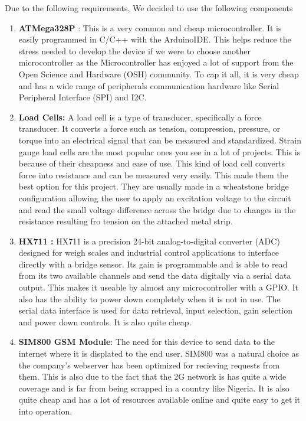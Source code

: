 Due to the following requirements, We decided to use the following components
\begin{enumerate}
\item \textbf{ATMega328P} : This is a very common and cheap microcontroller. It is easily programmed in C/C++ with the ArduinoIDE.
This helps reduce the stress needed to develop the device if we were to choose another microcontroller as the Microcontroller has enjoyed a lot of support from the Open Science and Hardware (OSH) community. To cap it all, it is very cheap and has a wide range of peripherals communication hardware like Serial Peripheral Interface (SPI) and I2C.

\item \textbf{Load Cells:} A load cell is a type of transducer, specifically a force transducer. It converts a force such as tension, compression, pressure, or torque into an electrical signal that can be measured and standardized. Strain gauge load cells are the most popular ones you see in a lot of projects. This is because of their cheapness and ease of use. This kind of load cell converts force into resistance and can be measured very easily. This made them the best option for this project. They are usually made in a wheatstone bridge configuration allowing the user to apply an excitation voltage to the circuit and read the small voltage difference across the bridge due to changes in the resistance resulting fro tension on the attached metal strip.

\item \textbf{HX711 :} HX711 is a precision 24-bit analog-to-digital converter (ADC) designed for weigh scales and industrial   control   applications to interface directly with a bridge sensor. Its gain is programmable and is able to read from its two available channels and send the data digitally via a serial data output. This makes it useable by almost any microcontroller with a GPIO. It also has the ability to power down completely when it is not in use. The serial data interface is used for data retrieval, input selection, gain selection and power down controls. It is also quite cheap.

\item \textbf{SIM800 GSM Module}: The need for this device to send data to the internet where it is displated to the end  user. SIM800 was a natural choice as the company's webserver has been optimized for recieving requests from them. This is also due to the fact that the 2G network is has quite a wide coverage and is far from being scrapped in a country like Nigeria. It is also quite cheap and has a lot of resources available online and quite easy to get it into operation. 


\end{enumerate}
